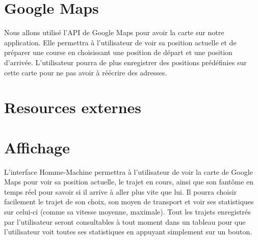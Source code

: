 \section{Google Maps}
Nous allons utilisé l'API de Google Maps pour avoir la carte sur notre application.
Elle permettra à l'utilisateur de voir sa position actuelle et de préparer une course en choisissant une position de départ et une position d'arrivée.
L'utilisateur pourra de plus enregistrer des positions prédéfinies sur cette carte pour ne pas avoir à réécrire des adresses.

\section{Resources externes}

\section{Affichage}
L'interface Homme-Machine permettra à l'utilisateur de voir la carte de Google Maps pour voir sa position actuelle, le trajet en cours,
ainsi que son fantôme en temps réel pour savoir si il arrive à aller plus vite que lui.
Il pourra choisir facilement le trajet de son choix, son moyen de transport et voir ses statistiques sur celui-ci (comme sa vitesse moyenne, maximale).
Tout les trajets enregistrés par l'utilisateur seront consultables à tout moment dans un tableau pour que l'utilisateur voit toutes ses statistiques en appuyant simplement sur un bouton.